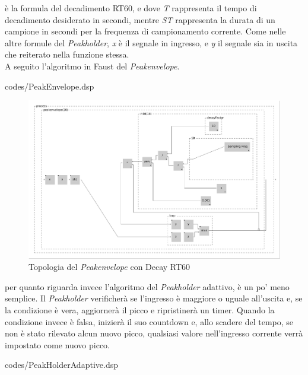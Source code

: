 è la formula del decadimento RT60, 
e dove \textit{T} rappresenta il tempo di decadimento desiderato in secondi, 
mentre \textit{ST} rappresenta la durata di un campione in secondi per la frequenza di campionamento corrente.
Come nelle altre formule del \textit{Peakholder}, \textit{x} è il segnale in ingresso, 
e \textit{y} il segnale sia in uscita che reiterato nella funzione stessa. \\
A seguito l'algoritmo in Faust del \textit{Peakenvelope}.

\vspace{0.5cm} 

{codes/PeakEnvelope.dsp}

\begin{figure}[h!]
\begin{center}
    \includegraphics[width=15cm]{figures/PeakEnvelope.pdf}
    \caption{Topologia del \textit{Peakenvelope} con Decay RT60}
\end{center}
\vspace{0.5cm}
\end{figure}

per quanto riguarda invece l'algoritmo del \textit{Peakholder} adattivo, è un po' meno semplice. 
Il \textit{Peakholder} verificherà se l'ingresso è maggiore o uguale all'uscita e, 
se la condizione è vera, aggiornerà il picco e ripristinerà un timer. 
Quando la condizione invece è falsa, 
inizierà il suo countdown e, allo scadere del tempo, se non è stato rilevato alcun nuovo picco, 
qualsiasi valore nell'ingresso corrente verrà impostato come nuovo picco.

\vspace{0.5cm} 

{codes/PeakHolderAdaptive.dsp}
\clearpage

